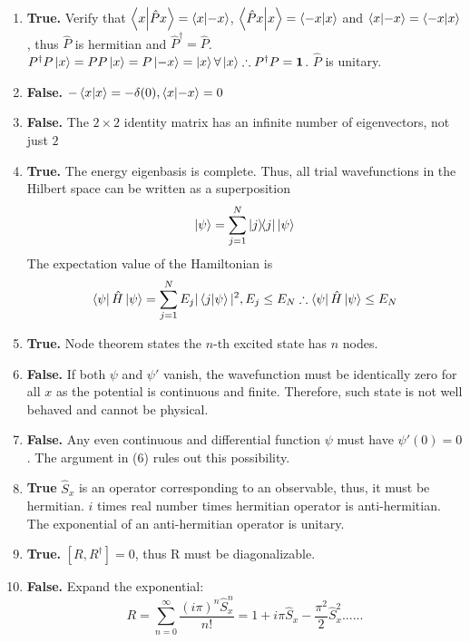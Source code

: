 \begin{sol}
\begin{enumerate}
    \item
    \textbf{True.} Verify that $\braket{ x}{ \hat Px}=\braket{x}{-x}$, $\braket{\hat Px}{x}=\braket{-x}{x}$ and $\braket{x}{-x}=\braket{-x}{x}$, thus $\hat P$ is hermitian and $\hat P^\dagger=\hat P$. $P^\dagger P\ket x=PP\ket x=P\ket {-x}=\ket x\forall\ket x\therefore P^\dagger P=\mathbf 1$. $\hat P$ is unitary.
    \item
    \textbf{False.} $-\braket{x}{x}=-\delta(0),\braket{x}{-x}=0$
    \item
    \textbf{False.} The $2\times 2$ identity matrix has an infinite number of eigenvectors, not just $2$
    \item
    \textbf{True.} The energy eigenbasis is complete. Thus, all trial wavefunctions in the Hilbert space can be written as a superposition
    \begin{equation}
	\ket\psi=\sum_{j=1}^N\ketbra{j}{j}\ket{\psi}
\end{equation}
    The expectation value of the Hamiltonian is 
    \begin{equation}
	\bra\psi\hat H\ket\psi=\sum_{j=1}^NE_j|\braket{j}{\psi}|^2, E_j\leq E_N\therefore \bra\psi\hat H\ket\psi\leq E_N
\end{equation}
    \item
    \textbf{True.} Node theorem states the $n$-th excited state has $n$ nodes.
    \item
    \textbf{False.} If both $\psi$ and $\psi'$ vanish, the wavefunction must be identically zero for all $x$ as the potential is continuous and finite. Therefore, such state is not well behaved and cannot be physical.
    \item
    \textbf{False.} Any even continuous and differential function $\psi$ must have $\psi'(0)=0$. The argument in (6) rules out this possibility.
    \item
    \textbf{True} $\hat S_x$ is an operator corresponding to an observable, thus, it must be hermitian. $i$ times real number times hermitian operator is anti-hermitian. The exponential of an anti-hermitian operator is unitary.
    \item
    \textbf{True.} $[R,R^\dagger]=0$, thus R must be diagonalizable.
    \item
    \textbf{False.} Expand the exponential:
    \begin{equation}
	R=\sum_{n=0}^\infty\frac{(i\pi)^n\hat S_x^n}{n!}=1+i\pi\hat S_x-\frac{\pi^2}{2}\hat S_x^2......
\end{equation}
\end{enumerate}
\end{sol}
